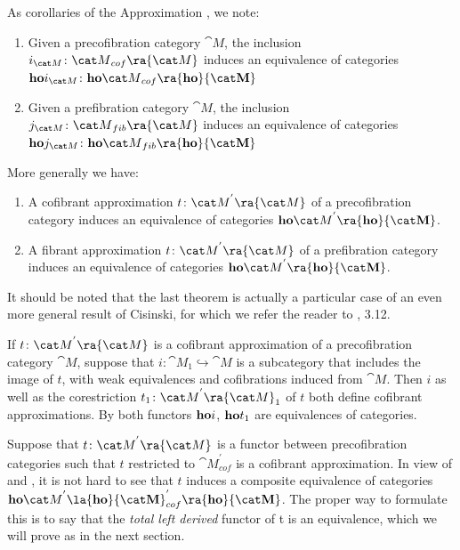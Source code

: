 As corollaries of the Approximation , we note:
\begin{thm}[Anderson]
\label{thm::catcofobjequiv}
\mbox{}
\begin{enumerate}
\item
Given a precofibration category ${\cat M}$, the inclusion $i_{\cat M} \colon {\cat M}_{cof} \ra {\cat M}$ induces an equivalence of categories ${\bf ho}i_{\cat M} \colon {\bf ho}{\cat M}_{cof} \ra {\bf ho}{\cat M}$
\item
Given a prefibration category ${\cat M}$, the inclusion $j_{\cat M} \colon {\cat M}_{fib} \ra {\cat M}$ induces an equivalence of categories ${\bf ho}j_{\cat M} \colon {\bf ho}{\cat M}_{fib} \ra {\bf ho}{\cat M}$
\end{enumerate}
\end{thm}

More generally we have:

\begin{thm}
\label{thm::homotopycatequiv}
\mbox{}
\begin{enumerate}
\item
A cofibrant approximation $t \colon {\cat M}^{'} \ra {\cat M}$ of a precofibration category induces an equivalence of categories ${\bf ho}{\cat M}^{'} \ra {\bf ho}{\cat M}$.
\item
A fibrant approximation $t \colon {\cat M}^{'} \ra {\cat M}$ of a prefibration category induces an equivalence of categories ${\bf ho}{\cat M}^{'} \ra {\bf ho}{\cat M}$.
\end{enumerate}
\end{thm}

It should be noted that the last theorem is actually a particular case of an even more general result of Cisinski, for which we refer the reader to \cite{Cisinski2}, 3.12.

\begin{rem}
\label{rem:intermediatecofcat}
If $t \colon {\cat M}^{'} \ra {\cat M}$ is a cofibrant approximation of a precofibration category ${\cat M}$, suppose that $i \colon {\cat M}_1 \hookrightarrow {\cat M}$ is a subcategory that includes the image of $t$, with weak equivalences and cofibrations induced from ${\cat M}$. Then $i$ as well as the corestriction $t_1 \colon {\cat M}^{'} \ra {\cat M}_1$ of $t$ both define cofibrant approximations. By  both functors ${\bf ho}i$, ${\bf ho}t_1$ are equivalences of categories.
\end{rem}

\begin{rem}
\label{rem:intermediatecofcat2}
Suppose that $t \colon {\cat M}^{'} \ra {\cat M}$ is a functor between precofibration categories such that $t$ restricted to ${\cat M}^{'}_{cof}$ is a cofibrant approximation. In view of  and , it is not hard to see that $t$ induces a composite equivalence of categories ${\bf ho}{\cat M}^{'} \la {\bf ho}{\cat M}^{'}_{cof} \ra {\bf ho}{\cat M}$. The proper way to formulate this is to say that the {\it total left derived} functor of t is an equivalence, which we will prove as  in the next section.
\end{rem}

